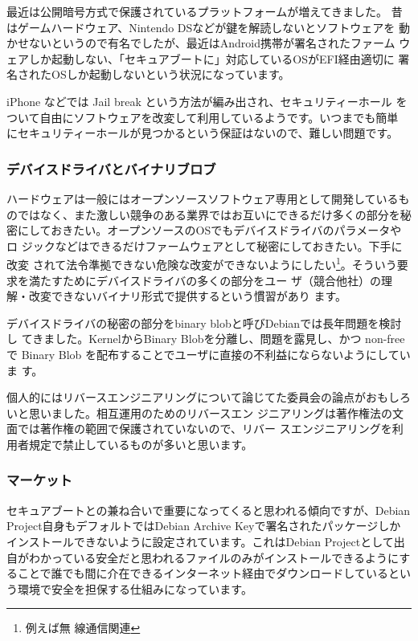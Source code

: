 \documentclass[mingoth,a4paper]{jsarticle}
\begin{document}
最近は公開暗号方式で保護されているプラットフォームが増えてきました。
昔はゲームハードウェア、Nintendo DSなどが鍵を解読しないとソフトウェアを
動かせないというので有名でしたが、最近はAndroid携帯が署名されたファーム
ウェアしか起動しない、「セキュアブートに」対応しているOSがEFI経由適切に
署名されたOSしか起動しないという状況になっています。

iPhone などでは Jail break という方法が編み出され、セキュリティーホール
をついて自由にソフトウェアを改変して利用しているようです。いつまでも簡単
にセキュリティーホールが見つかるという保証はないので、難しい問題です。

\subsubsection{デバイスドライバとバイナリブロブ}

ハードウェアは一般にはオープンソースソフトウェア専用として開発しているも
のではなく、また激しい競争のある業界ではお互いにできるだけ多くの部分を秘
密にしておきたい。オープンソースのOSでもデバイスドライバのパラメータやロ
ジックなどはできるだけファームウェアとして秘密にしておきたい。下手に改変
されて法令準拠できない危険な改変ができないようにしたい\footnote{例えば無
線通信関連}。そういう要求を満たすためにデバイスドライバの多くの部分をユー
ザ（競合他社）の理解・改変できないバイナリ形式で提供するという慣習があり
ます。

デバイスドライバの秘密の部分をbinary blobと呼びDebianでは長年問題を検討し
てきました。KernelからBinary Blobを分離し、問題を露見し、かつ non-free で
Binary Blob を配布することでユーザに直接の不利益にならないようにしていま
す。

個人的にはリバースエンジニアリングについて論じてた委員会の論点がおもしろ
いと思いました。\cite{bunka-reverse-eng2008}相互運用のためのリバースエン
ジニアリングは著作権法の文面では著作権の範囲で保護されていないので、リバー
スエンジニアリングを利用者規定で禁止しているものが多いと思います。

\subsubsection{マーケット}

セキュアブートとの兼ね合いで重要になってくると思われる傾向ですが、Debian
Project自身もデフォルトではDebian Archive Keyで署名されたパッケージしか
インストールできないように設定されています。これはDebian Projectとして出
自がわかっている安全だと思われるファイルのみがインストールできるようにす
ることで誰でも間に介在できるインターネット経由でダウンロードしているとい
う環境で安全を担保する仕組みになっています。
\end{document}
